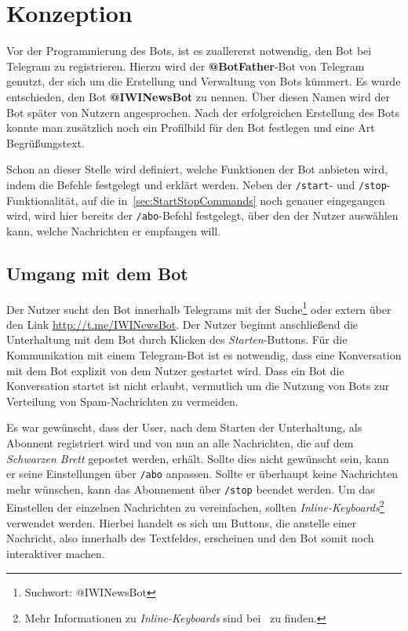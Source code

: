 \chapter{Konzeption}
Vor der Programmierung des Bots, ist es zuallererst notwendig, den Bot bei Telegram zu registrieren. Hierzu wird der \textbf{@BotFather}-Bot von Telegram genutzt, der sich um die Erstellung und Verwaltung von Bots kümmert. Es wurde entschieden, den Bot \textbf{@IWINewsBot} zu nennen. Über diesen Namen wird der Bot später von Nutzern angesprochen. Nach der erfolgreichen Erstellung des Bots konnte man zusätzlich noch ein Profilbild für den Bot festlegen und eine Art Begrüßungstext.

Schon an dieser Stelle wird definiert, welche Funktionen der Bot anbieten wird, indem die Befehle festgelegt und erklärt werden. Neben der \texttt{/start}- und \texttt{/stop}-Funktionalität, auf die in~\autoref{sec:StartStopCommands} noch genauer eingegangen wird, wird hier bereits der \texttt{/abo}-Befehl festgelegt, über den der Nutzer auswählen kann, welche Nachrichten er empfangen will.

\section{Umgang mit dem Bot}
Der Nutzer sucht den Bot innerhalb Telegrams mit der Suche\footnote{Suchwort: @IWINewsBot} oder extern über den Link \url{http://t.me/IWINewsBot}.
Der Nutzer beginnt anschließend die Unterhaltung mit dem Bot durch Klicken des \textit{Starten}-Buttons.
Für die Kommunikation mit einem Telegram-Bot ist es notwendig, dass eine Konversation mit dem Bot explizit von dem Nutzer gestartet wird. Dass ein Bot die Konversation startet ist nicht erlaubt, vermutlich um die Nutzung von Bots zur Verteilung von Spam-Nachrichten zu vermeiden.

Es war gewünscht, dass der User, nach dem Starten der Unterhaltung, als Abonnent registriert wird und von nun an alle Nachrichten, die auf dem \emph{Schwarzen Brett} gepostet werden, erhält. Sollte dies nicht gewünscht sein, kann er seine Einstellungen über \texttt{/abo} anpassen. Sollte er überhaupt keine Nachrichten mehr wünschen, kann das Abonnement über \texttt{/stop} beendet werden. Um das Einstellen der einzelnen Nachrichten zu vereinfachen, sollten \emph{Inline-Keyboards}\footnote{Mehr Informationen zu \emph{Inline-Keyboards} sind bei~\cite{InlineKeyboards} zu finden.} verwendet werden. Hierbei handelt es sich um Buttons, die anstelle einer Nachricht, also innerhalb des Textfeldes, erscheinen und den Bot somit noch interaktiver machen.

